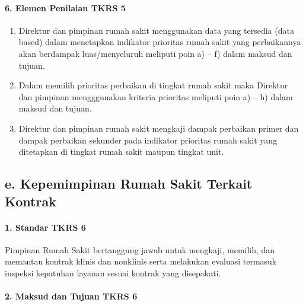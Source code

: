 \documentclass[
]{book}
\providecommand{\tightlist}{%
  \setlength{\itemsep}{0pt}\setlength{\parskip}{0pt}}
\begin{document}
\hypertarget{elemen-penilaian-tkrs-5}{%
\paragraph*{6. Elemen Penilaian TKRS 5}\label{elemen-penilaian-tkrs-5}}

\begin{enumerate}
\def\labelenumi{\alph{enumi}.}
\tightlist
\item
  Direktur dan pimpinan rumah sakit menggunakan data yang tersedia (data based) dalam menetapkan indikator prioritas rumah sakit yang perbaikannya akan berdampak luas/menyeluruh meliputi poin a) -- f) dalam maksud dan tujuan.
\item
  Dalam memilih prioritas perbaikan di tingkat rumah sakit maka Direktur dan pimpinan mengggunakan kriteria prioritas meliputi poin a) -- h) dalam maksud dan tujuan.
\item
  Direktur dan pimpinan rumah sakit mengkaji dampak perbaikan primer dan dampak perbaikan sekunder pada indikator prioritas rumah sakit yang ditetapkan di tingkat rumah sakit maupun tingkat unit.
\end{enumerate}

\hypertarget{e.-kepemimpinan-rumah-sakit-terkait-kontrak}{%
\subsection*{e. Kepemimpinan Rumah Sakit Terkait Kontrak}\label{e.-kepemimpinan-rumah-sakit-terkait-kontrak}}

\hypertarget{standar-tkrs-6}{%
\paragraph*{1. Standar TKRS 6}\label{standar-tkrs-6}}

Pimpinan Rumah Sakit bertanggung jawab untuk mengkaji, memilih, dan memantau kontrak klinis dan nonklinis serta melakukan evaluasi termasuk inspeksi kepatuhan layanan sesuai kontrak yang disepakati.

\hypertarget{maksud-dan-tujuan-tkrs-6}{%
\paragraph*{2. Maksud dan Tujuan TKRS 6}\label{maksud-dan-tujuan-tkrs-6}}
\end{document}
